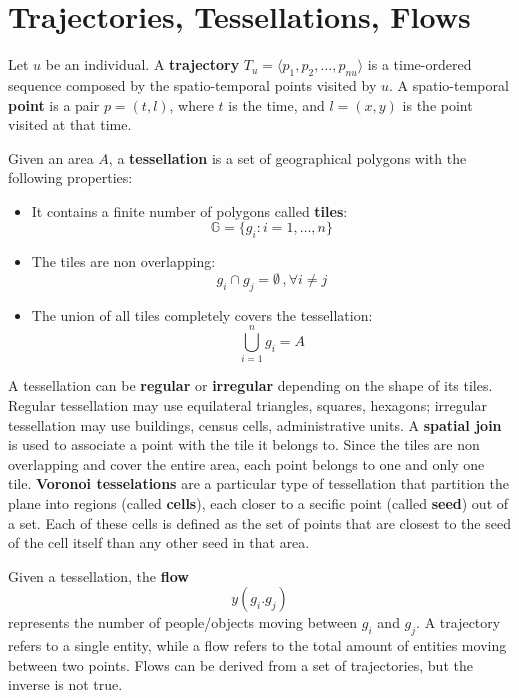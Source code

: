 \section{Trajectories, Tessellations, Flows}

Let $u$ be an individual. A \textbf{trajectory} $T_u = \langle p_1, p_2, \dots, p_{nu} \rangle$ is a time-ordered sequence composed by the spatio-temporal points visited by $u$. A spatio-temporal \textbf{point} is a pair $p = (t,l)$, where $t$ is the time, and $l=(x,y)$ is the point visited at that time.

Given an area $A$, a \textbf{tessellation} is a set of geographical polygons with the following properties:
\begin{itemize}
    \item It contains a finite number of polygons called \textbf{tiles}:
    \begin{equation*}
        \mathbb{G} = \{g_i : i = 1, \dots, n\}
    \end{equation*}
    \item The tiles are non overlapping:
    \begin{equation*}
        g_i \cap g_j = \emptyset \,, \forall i \neq j
    \end{equation*}
    \item The union of all tiles completely covers the tessellation:
    \begin{equation*}
        \bigcup_{i=1}^n g_i = A
    \end{equation*}
\end{itemize}
A tessellation can be \textbf{regular} or \textbf{irregular} depending on the shape of its tiles. Regular tessellation may use equilateral triangles, squares, hexagons; irregular tessellation may use buildings, census cells, administrative units. A \textbf{spatial join} is used to associate a point with the tile it belongs to. Since the tiles are non overlapping and cover the entire area, each point belongs to one and only one tile. \textbf{Voronoi tesselations} are a particular type of tessellation that partition the plane into regions (called \textbf{cells}), each closer to a secific point (called \textbf{seed}) out of a set. Each of these cells is defined as the set of points that are closest to the seed of the cell itself than any other seed in that area.

Given a tessellation, the \textbf{flow}
\begin{equation*}
    y(g_i. g_j)
\end{equation*}
represents the number of people/objects moving between $g_i$ and $g_j$. A trajectory refers to a single entity, while a flow refers to the total amount of entities moving between two points. Flows can be derived from a set of trajectories, but the inverse is not true.

